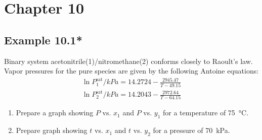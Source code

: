 \documentclass[../main.tex]{subfiles}
\begin{document}
\section*{Chapter 10}

%
\subsection*{Example 10.1*}
%
Binary system acetonitrile(1)/nitromethane(2) conforms closely to Raoult's law.
Vapor pressures for the pure species are given by the following
Antoine equations:
%
\begin{gather*}%
  \ln P_1^{\text{sat}} / \unit{kPa} = 14.2724 - \frac{2945.47}{T - 49.15}\\
  \ln P_2^{\text{sat}} / \unit{kPa} = 14.2043 - \frac{2972.64}{T - 64.15}
\end{gather*}
%
\begin{enumerate}[label=(\alph*)]
  \item Prepare a graph showing $P$ vs. $x_{1}$ and $P$ vs. $y_{1}$
    for a temperature of 75~\unit{\degreeCelsius}.
  \item Prepare graph showing $t$ vs. $x_{1}$ and $t$ vs. $y_{2}$
    for a pressure of 70~\unit{\kilo\pascal}.
\end{enumerate}
%
\end{document}
